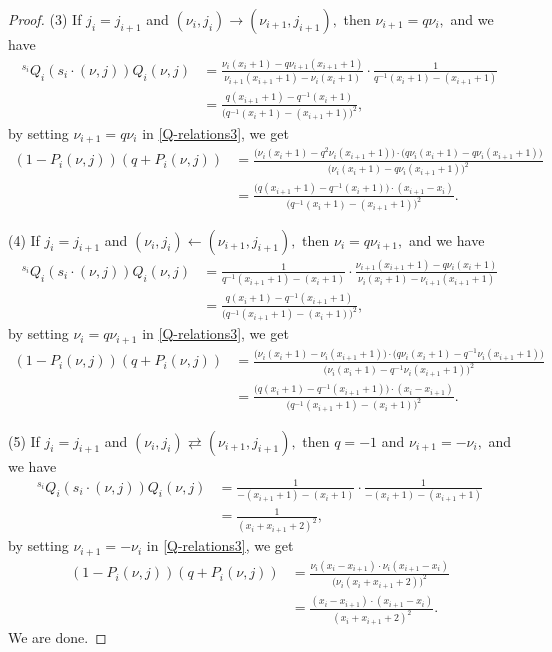 \documentclass[11pt, reqno]{amsart} \textwidth=14.9cm \oddsidemargin=1cm \evensidemargin=1cm
\theoremstyle{definition}
\numberwithin{equation}{section}
\begin{document}
\begin{proof}
(3) If $j_{i}= j_{i+1}$ and $(\nu_i, j_{i})\rightarrow (\nu_{i+1}, j_{i+1}),$ then $\nu_{i+1}=q\nu_{i},$ and we have
\begin{align*}
{}^{s_{i}}Q_{i}(s_{i}\cdot(\nu, j))Q_{i}(\nu, j)&=\frac{\nu_{i}(x_{i}+1)-q\nu_{i+1}(x_{i+1}+1)}
{\nu_{i+1}(x_{i+1}+1)-\nu_{i}(x_{i}+1)}\cdot\frac{1}{q^{-1}(x_{i}+1)-(x_{i+1}+1)}\\
&=\frac{q(x_{i+1}+1)-q^{-1}(x_{i}+1)}{\big(q^{-1}(x_{i}+1)-(x_{i+1}+1)\big)^{2}},
\end{align*}
by setting $\nu_{i+1}=q\nu_{i}$ in \eqref{Q-relations3}, we get
\begin{align*}
(1-P_{i}(\nu, j))(q+P_{i}(\nu, j))&=\frac{\big(\nu_{i}(x_{i}+1)-q^{2}\nu_{i}(x_{i+1}+1)\big)\cdot\big(q\nu_{i}(x_{i}+1)-q\nu_{i}(x_{i+1}+1)\big)}
{\big(\nu_{i}(x_{i}+1)-q\nu_{i}(x_{i+1}+1)\big)^{2}}\\
&=\frac{\big(q(x_{i+1}+1)-q^{-1}(x_{i}+1)\big)\cdot(x_{i+1}-x_{i})}{\big(q^{-1}(x_{i}+1)-(x_{i+1}+1)\big)^{2}}.
\end{align*}\vspace{0.25cm}

(4) If $j_{i}= j_{i+1}$ and $(\nu_i, j_{i})\leftarrow (\nu_{i+1}, j_{i+1}),$ then $\nu_{i}=q\nu_{i+1},$ and we have
\begin{align*}
{}^{s_{i}}Q_{i}(s_{i}\cdot(\nu, j))Q_{i}(\nu, j)&=\frac{1}{q^{-1}(x_{i+1}+1)-(x_{i}+1)}\cdot
\frac{\nu_{i+1}(x_{i+1}+1)-q\nu_{i}(x_{i}+1)}{\nu_{i}(x_{i}+1)-\nu_{i+1}(x_{i+1}+1)}\\
&=\frac{q(x_{i}+1)-q^{-1}(x_{i+1}+1)}{\big(q^{-1}(x_{i+1}+1)-(x_{i}+1)\big)^{2}},
\end{align*}
by setting $\nu_{i}=q\nu_{i+1}$ in \eqref{Q-relations3}, we get
\begin{align*}
(1-P_{i}(\nu, j))(q+P_{i}(\nu, j))&=\frac{\big(\nu_{i}(x_{i}+1)-\nu_{i}(x_{i+1}+1)\big)\cdot\big(q\nu_{i}(x_{i}+1)-q^{-1}\nu_{i}(x_{i+1}+1)\big)}
{\big(\nu_{i}(x_{i}+1)-q^{-1}\nu_{i}(x_{i+1}+1)\big)^{2}}\\
&=\frac{\big(q(x_{i}+1)-q^{-1}(x_{i+1}+1)\big)\cdot(x_{i}-x_{i+1})}{\big(q^{-1}(x_{i+1}+1)-(x_{i}+1)\big)^{2}}.
\end{align*}\vspace{0.25cm}

(5) If $j_{i}= j_{i+1}$ and $(\nu_i, j_{i})\rightleftarrows (\nu_{i+1}, j_{i+1}),$ then $q=-1$ and $\nu_{i+1}=-\nu_{i},$ and we have
\begin{align*}
{}^{s_{i}}Q_{i}(s_{i}\cdot(\nu, j))Q_{i}(\nu, j)&=\frac{1}{-(x_{i+1}+1)-(x_{i}+1)}\cdot
\frac{1}{-(x_{i}+1)-(x_{i+1}+1)}\\
&=\frac{1}{(x_{i}+x_{i+1}+2)^{2}},
\end{align*}
by setting $\nu_{i+1}=-\nu_{i}$ in \eqref{Q-relations3}, we get
\begin{align*}
(1-P_{i}(\nu, j))(q+P_{i}(\nu, j))&=\frac{\nu_{i}(x_{i}-x_{i+1})\cdot\nu_{i}(x_{i+1}-x_{i})}
{\big(\nu_{i}(x_{i}+x_{i+1}+2)\big)^{2}}\\
&=\frac{(x_{i}-x_{i+1})\cdot(x_{i+1}-x_{i})}{(x_{i}+x_{i+1}+2)^{2}}.
\end{align*}
We are done.\end{proof}
\end{document}
